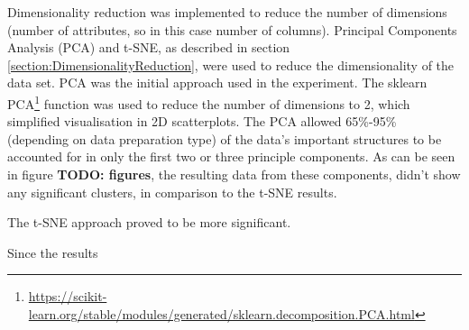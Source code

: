 
Dimensionality reduction was implemented to reduce the number of dimensions (number of attributes, so in this case number of columns). Principal Components Analysis (PCA) and t-SNE, as described in section \ref{section:DimensionalityReduction}, were used to reduce the dimensionality of the data set. PCA was the initial approach used in the experiment. The sklearn PCA\footnote{\url{https://scikit-learn.org/stable/modules/generated/sklearn.decomposition.PCA.html}} function was used to reduce the number of dimensions to 2, which simplified visualisation in 2D scatterplots. The PCA allowed 65\%-95\% (depending on data preparation type) of the data's important structures to be accounted for in only the first two or three principle components. As can be seen in figure \textbf{TODO: figures}, the resulting data from these components, didn't show any significant clusters, in comparison to the t-SNE results.

The t-SNE approach proved to be more significant.

Since the results 


